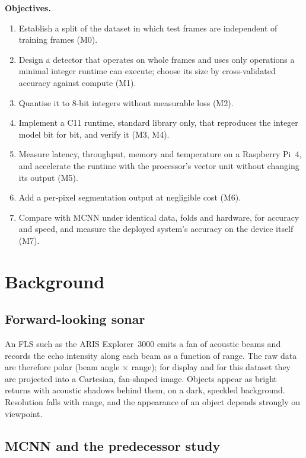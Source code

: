 \documentclass[11pt,a4paper]{article}
\begin{document}
\textbf{Objectives.}
\begin{enumerate}
  \item Establish a split of the dataset in which test frames are
        independent of training frames (M0).
  \item Design a detector that operates on whole frames and uses only
        operations a minimal integer runtime can execute; choose its size by
        cross-validated accuracy against compute (M1).
  \item Quantise it to 8-bit integers without measurable loss (M2).
  \item Implement a C11 runtime, standard library only, that reproduces the
        integer model bit for bit, and verify it (M3, M4).
  \item Measure latency, throughput, memory and temperature on a
        Raspberry Pi~4, and accelerate the runtime with the processor's
        vector unit without changing its output (M5).
  \item Add a per-pixel segmentation output at negligible cost (M6).
  \item Compare with MCNN under identical data, folds and hardware, for
        accuracy and speed, and measure the deployed system's accuracy on the
        device itself (M7).
\end{enumerate}

\section{Background}

\subsection{Forward-looking sonar}

An FLS such as the ARIS Explorer~3000 emits a fan of acoustic beams and
records the echo intensity along each beam as a function of range. The raw
data are therefore polar (beam angle $\times$ range); for display and for
this dataset they are projected into a Cartesian, fan-shaped image. Objects
appear as bright returns with acoustic shadows behind them, on a dark,
speckled background. Resolution falls with range, and the appearance of an
object depends strongly on viewpoint.

\subsection{MCNN and the predecessor study}
\end{document}
